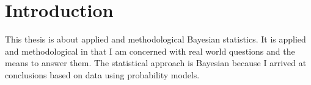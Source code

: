 \documentclass[a4paper, nobind]{templates/ociamthesis}
\begin{document}
\begin{romanpages}
  \dominitoc %

\flushbottom

\tableofcontents

\listoffigures
	\mtcaddchapter

\listoftables
  \mtcaddchapter




\end{romanpages}

\flushbottom

\hypertarget{introduction}{%
\chapter{Introduction}\label{introduction}}

\adjustmtc
{}

This thesis is about applied and methodological Bayesian statistics.
It is applied and methodological in that I am concerned with real world questions and the means to answer them.
The statistical approach is Bayesian because I arrived at conclusions based on data using probability models.
\end{document}
